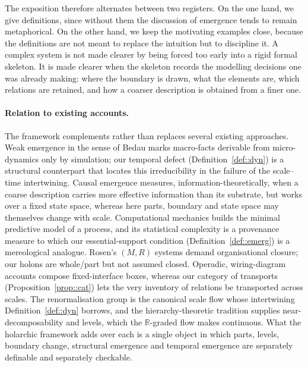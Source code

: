 \documentclass[runningheads]{llncs}
\newcommand{\R}{\mathbb{R}}
\begin{document}
The exposition therefore alternates between two registers. On the one hand, we give definitions, since without them the discussion of emergence tends to remain metaphorical. On the other hand, we keep the motivating examples close, because the definitions are not meant to replace the intuition but to discipline it. A complex system is not made clearer by being forced too early into a rigid formal skeleton. It is made clearer when the skeleton records the modelling decisions one was already making: where the boundary is drawn, what the elements are, which relations are retained, and how a coarser description is obtained from a finer one.

\paragraph{Relation to existing accounts.}
The framework complements rather than replaces several existing approaches. Weak emergence in the sense of Bedau \cite{Bedau1997} marks macro-facts derivable from micro-dynamics only by simulation; our temporal defect (Definition~\ref{def::dyn}) is a structural counterpart that locates this irreducibility in the failure of the scale--time intertwining. Causal emergence \cite{Klein2020} measures, information-theoretically, when a coarse description carries more effective information than its substrate, but works over a fixed state space, whereas here parts, boundary and state space may themselves change with scale. Computational mechanics \cite{Crutchfield1994} builds the minimal predictive model of a process, and its statistical complexity is a provenance measure to which our essential-support condition (Definition~\ref{def::emerg}) is a mereological analogue. Rosen's $(M,R)$ systems \cite{Rosen1991} demand organisational closure; our holons are whole/part but not assumed closed. Operadic, wiring-diagram accounts \cite{Spivak2013} compose fixed-interface boxes, whereas our category of transports (Proposition~\ref{prop::cat}) lets the very inventory of relations be transported across scales. The renormalisation group \cite{Wilson1975,Kadanoff1966} is the canonical scale flow whose intertwining Definition~\ref{def::dyn} borrows, and the hierarchy-theoretic tradition \cite{Simon2012,Salthe1985,Wimsatt1994} supplies near-decomposability and levels, which the $\R$-graded flow makes continuous. What the holarchic framework adds over each is a single object in which parts, levels, boundary change, structural emergence and temporal emergence are separately definable and separately checkable.
\end{document}

